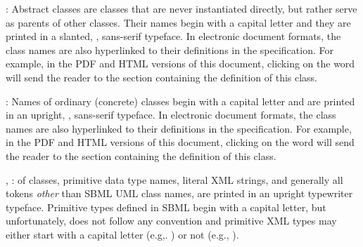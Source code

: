 \begin{description}
  
\item {}: Abstract classes are classes
  that are never instantiated directly, but rather serve as
  parents of other classes.  Their names begin with a capital
  letter and they are printed in a slanted, ,
  sans-serif typeface.  In electronic document formats, the class
  names are also hyperlinked to their definitions in the
  specification.  For example, in the PDF and HTML versions of
  this document, clicking on the word \SBase will send the reader
  to the section containing the definition of this class.
  
\item {}: Names of ordinary (concrete) classes begin
  with a capital letter and are printed in an upright,
  , sans-serif typeface.  In electronic document
  formats, the class names are also hyperlinked to their
  definitions in the specification.  For example, in the PDF and
  HTML versions of this document, clicking on the word \Species
  will send the reader to the section containing the definition of
  this class.

\item {}, :  of
  classes, primitive data type names, literal XML strings, and
  generally all tokens \emph{other} than SBML UML class names, are
  printed in an upright typewriter typeface.  Primitive types
  defined in SBML begin with a capital letter, but unfortunately,
  \xmlschemaone does not follow any convention and primitive XML
  types may either start with a capital letter (e.g,.
  ) or not (e.g., ).

\end{description}


